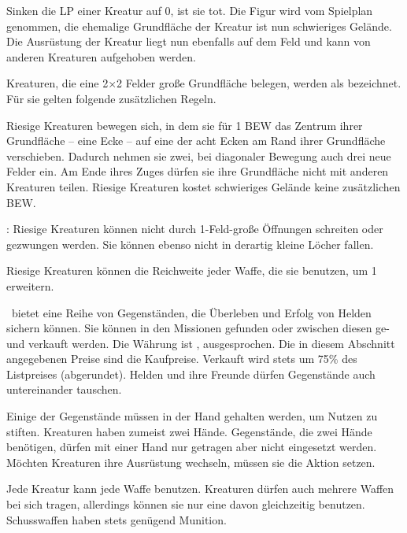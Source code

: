 {	
		Sinken die LP einer Kreatur auf 0, ist sie tot. Die Figur wird vom Spielplan genommen, die ehemalige Grundfläche der Kreatur ist nun schwieriges Gelände. Die Ausrüstung der Kreatur liegt nun ebenfalls auf dem Feld und kann von anderen Kreaturen aufgehoben werden.

		Kreaturen, die eine 2×2 Felder große Grundfläche belegen, werden als  bezeichnet. Für sie gelten folgende zusätzlichen Regeln.

		 Riesige Kreaturen bewegen sich, in dem sie für 1 BEW das Zentrum ihrer Grundfläche -- eine Ecke -- auf eine der acht Ecken am Rand ihrer Grundfläche verschieben. Dadurch nehmen sie zwei, bei diagonaler Bewegung auch drei neue Felder ein. Am Ende ihres Zuges dürfen sie ihre Grundfläche nicht mit anderen Kreaturen teilen. Riesige Kreaturen kostet schwieriges Gelände keine zusätzlichen BEW.

		: Riesige Kreaturen können nicht durch 1-Feld-große Öffnungen schreiten oder gezwungen werden. Sie können ebenso nicht in derartig kleine Löcher fallen.

		 Riesige Kreaturen können die Reichweite jeder Waffe, die sie benutzen, um 1 erweitern.

		\bmh~bietet eine Reihe von Gegenständen, die Überleben und Erfolg von Helden sichern können. Sie können in den Missionen gefunden oder zwischen diesen ge- und verkauft werden. Die Währung ist ,  ausgesprochen. Die in diesem Abschnitt angegebenen Preise sind die Kaufpreise. Verkauft wird stets um 75\% des Listpreises (abgerundet). Helden und ihre Freunde dürfen Gegenstände auch untereinander tauschen.

		Einige der Gegenstände müssen in der Hand gehalten werden, um Nutzen zu stiften. Kreaturen haben zumeist zwei Hände. Gegenstände, die zwei Hände benötigen, dürfen mit einer Hand nur getragen aber nicht eingesetzt werden. Möchten Kreaturen ihre Ausrüstung wechseln, müssen sie die Aktion  setzen.

			Jede Kreatur kann jede Waffe benutzen. Kreaturen dürfen auch mehrere Waffen bei sich tragen, allerdings können sie nur eine davon gleichzeitig benutzen. Schusswaffen haben stets genügend Munition.

}

